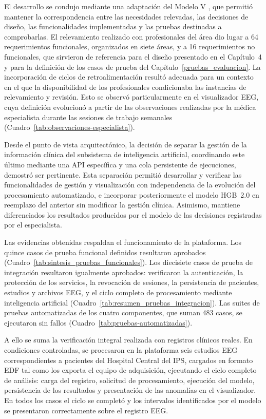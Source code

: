 El desarrollo se condujo mediante una adaptación del Modelo V \citep{ForsbergMooz1991}, que permitió mantener la correspondencia entre las necesidades relevadas, las decisiones de diseño, las funcionalidades implementadas y las pruebas destinadas a comprobarlas.
El relevamiento realizado con profesionales del área dio lugar a 64 requerimientos funcionales, organizados en siete áreas, y a 16 requerimientos no funcionales, que sirvieron de referencia para el diseño presentado en el Capítulo~4 y para la definición de los casos de prueba del Capítulo~\ref{pruebas_evaluacion}.
La incorporación de ciclos de retroalimentación resultó adecuada para un contexto en el que la disponibilidad de los profesionales condicionaba las instancias de relevamiento y revisión.
Esto se observó particularmente en el visualizador EEG, cuya definición evolucionó a partir de las observaciones realizadas por la médica especialista durante las sesiones de trabajo semanales (Cuadro~\ref{tab:observaciones-especialista}).

Desde el punto de vista arquitectónico, la decisión de separar la gestión de la información clínica del subsistema de inteligencia artificial, coordinando este último mediante una API específica y una cola persistente de ejecuciones, demostró ser pertinente.
Esta separación permitió desarrollar y verificar las funcionalidades de gestión y visualización con independencia de la evolución del procesamiento automatizado, e incorporar posteriormente el modelo HGB~2.0 en reemplazo del anterior sin modificar la gestión clínica.
Asimismo, mantiene diferenciados los resultados producidos por el modelo de las decisiones registradas por el especialista.

Las evidencias obtenidas respaldan el funcionamiento de la plataforma.
Los quince casos de prueba funcional definidos resultaron aprobados (Cuadro~\ref{tab:sintesis_pruebas_funcionales}).
Los diecisiete casos de prueba de integración resultaron igualmente aprobados: verificaron la autenticación, la protección de los servicios, la revocación de sesiones, la persistencia de pacientes, estudios y archivos EEG, y el ciclo completo de procesamiento mediante inteligencia artificial (Cuadro~\ref{tab:resumen_pruebas_integracion}).
Las suites de pruebas automatizadas de los cuatro componentes, que suman 483 casos, se ejecutaron sin fallos (Cuadro~\ref{tab:pruebas-automatizadas}).

A ello se suma la verificación integral realizada con registros clínicos reales.
En condiciones controladas, se procesaron en la plataforma seis estudios EEG correspondientes a pacientes del Hospital Central del IPS, cargados en formato EDF tal como los exporta el equipo de adquisición, ejecutando el ciclo completo de análisis: carga del registro, solicitud de procesamiento, ejecución del modelo, persistencia de los resultados y presentación de las anomalías en el visualizador.
En todos los casos el ciclo se completó y los intervalos identificados por el modelo se presentaron correctamente sobre el registro EEG.

